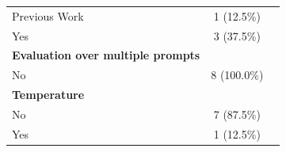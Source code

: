 \documentclass[a4paper]{article}
\begin{document}
\begin{appendices}
\begin{table}[ht]
\begin{tabularx}{\textwidth}{|l|c|X|}
		\hspace{3mm} Previous Work & 1 (12.5\%) & \cite{10.1145/3663529.3663794} \\
		\hspace{3mm} Yes & 3 (37.5\%) & \cite{10.1145/3597503.3639117,10659742,10599336} \\
		\textbf{Evaluation over multiple prompts} && \\
		\hspace{3mm} No & 8 (100.0\%) & \cite{10.1145/3597503.3639117,10.1145/3597503.3639194,10.1145/3663529.3663785,10.1145/3663529.3663794,10648982,10659742,10746847,10599336} \\
		\textbf{Temperature} && \\
		\hspace{3mm} No & 7 (87.5\%) & \cite{10.1145/3597503.3639194,10.1145/3663529.3663785,10.1145/3663529.3663794,10648982,10659742,10746847,10599336} \\
		\hspace{3mm} Yes & 1 (12.5\%) & \cite{10.1145/3597503.3639117} \\
		\hline
	\end{tabularx}
	\label{refs:prompt_results}
\end{table}

\end{appendices}
\end{document}
